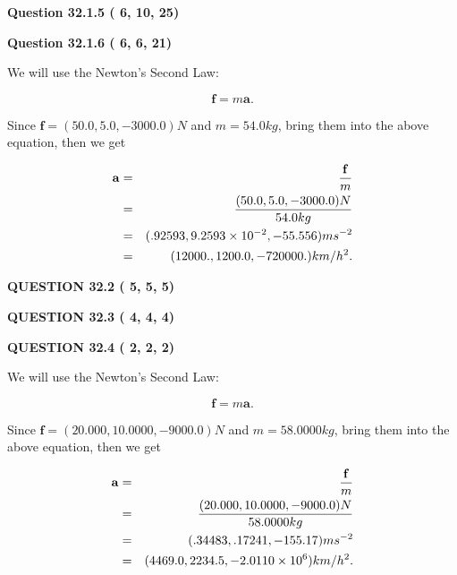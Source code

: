 \documentclass[12pt]{article}
\begin{document}
 
 
  
\vspace{0.2in}
  
{\textbf{\Large{Question
32.1.5 
 (          6,         10,         25)
}}}
  
  
  
\vspace{0.2in}
  
{\textbf{\Large{Question
32.1.6 
 (          6,          6,         21)
}}}
  
  
 
 

We will use the Newton's Second Law:
 
\[
\mathbf{f}=m\mathbf{a}.
\]
 
Since $\mathbf{f}=( %
50.0,  %
5.0,  %
-3000.0 )N$
and $m= %
54.0 kg$, bring them into the above equation, then we get
 
\begin{eqnarray*}
\mathbf{a}&=&\frac{\mathbf{f}}m  \\
&=&\frac{(
50.0 ,
5.0 ,
-3000.0 )N
}{ %
54.0 kg}  \\
&=&(
.92593 ,
9.2593 \times 10^{-2},
-55.556
)ms^{-2} \\
&=&(
12000. ,
1200.0 ,
-720000.
)km/h^2.
\end{eqnarray*}
 
 
 
  
\vspace{0.2in}
  
{\textbf{\Large{QUESTION
32.2 
 (          5,          5,          5)
}}}
  
  
  
\vspace{0.2in}
  
{\textbf{\Large{QUESTION
32.3 
 (          4,          4,          4)
}}}
  
  
  
\vspace{0.2in}
  
{\textbf{\Large{QUESTION
32.4 
 (          2,          2,          2)
}}}
  
  
 
 

We will use the Newton's Second Law:
 
\[
\mathbf{f}=m\mathbf{a}.
\]
 
Since $\mathbf{f}=( %
20.000,  %
10.0000,  %
-9000.0 )N$
and $m= %
58.0000kg$, bring them into the above equation, then we get
 
\begin{eqnarray*}
\mathbf{a}&=&\frac{\mathbf{f}}m  \\
&=&\frac{(
20.000 ,
10.0000 ,
-9000.0 )N
}{ %
58.0000 kg}  \\
&=&(
.34483 ,
.17241,
-155.17
)ms^{-2} \\
&=&(
4469.0 ,
2234.5 ,
-2.0110 \times 10^{6}
)km/h^2.
\end{eqnarray*}
 
\end{document}
